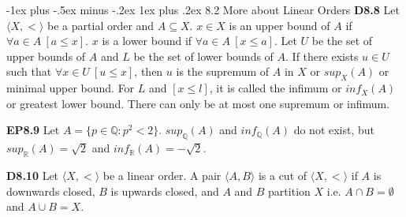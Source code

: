 \documentclass[10pt, landscape]{article}
\makeatletter
\renewcommand{\subsection}{\@startsection{subsection}{3}{0mm}%
                                {-1ex plus -.5ex minus -.2ex}%
                                {1ex plus .2ex}%
                                {\normalfont\small\bfseries}}%
\makeatother
\begin{document}
\begin{multicols*}{3}





\subsection{8.2 More about Linear Orders}
\textbf{D8.8} Let $\langle X, < \rangle$ be a partial order and $A \subseteq X$. $x \in X$ is an upper bound of $A$ if $\forall a \in A \ [a \leq x]$. $x$ is a lower bound if $\forall a \in A \ [x \leq a]$. Let $U$ be the set of upper bounds of $A$ and $L$ be the set of lower bounds of $A$. If there exists $u \in U$ such that $\forall x \in U \ [u \leq x]$, then $u$ is the supremum of $A$ in $X$ or $sup_X(A)$ or minimal upper bound. For $L$ and $[x \leq l]$, it is called the infimum or $inf_X(A)$ or greatest lower bound. There can only be at most one supremum or infimum.

\textbf{EP8.9} Let $A=\{p \in \mathbb{Q} : p^2 < 2\}$. $sup_\mathbb{Q}(A)$ and $inf_\mathbb{Q}(A)$ do not exist, but $sup_\mathbb{R}(A)=\sqrt2$ and $inf_\mathbb{R}(A)=-\sqrt2$.

\textbf{D8.10} Let $\langle X, < \rangle$ be a linear order. A pair $\langle A, B \rangle$ is a cut of $\langle X, < \rangle$ if $A$ is downwards closed, $B$ is upwards closed, and $A$ and $B$ partition $X$ i.e. $A \cap B = \emptyset$ and $A \cup B = X$.


\end{multicols*}
\end{document}
